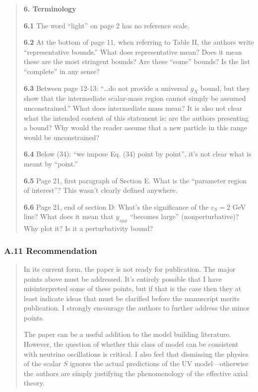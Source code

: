 \documentclass[
  chinese,
  UTF8]{ctexart}
\begin{document}
\begin{quote}
\textbf{6. Terminology}

\textbf{6.1} The word ``light'' on page 2 has no reference scale.

\textbf{6.2} At the bottom of page 11, when referring to Table II, the
authors write ``representative bounds.'' What does representative mean?
Does it mean these are the most stringent bounds? Are these ``some''
bounds? Is the list ``complete'' in any sense?

\textbf{6.3} Between page 12-13: ``\ldots do not provide a universal
\(g_X\) bound, but they show that the intermediate scalar-mass region
cannot simply be assumed unconstrained.'' What does intermediate mass
mean? It is also not clear what the intended content of this statement
is: are the authors presenting a bound? Why would the reader assume that
a new particle in this range would be unconstrained?

\textbf{6.4} Below (34): ``we impose Eq. (34) point by point'', it's not
clear what is meant by ``point.''

\textbf{6.5} Page 21, first paragraph of Section E. What is the
``parameter region of interest''? This wasn't clearly defined anywhere.

\textbf{6.6} Page 21, end of section D: What's the significance of the
\(v_S=2\) GeV line? What does it mean that \(y_{s\mu\mu}\) ``becomes
large'' (nonperturbative)? Why plot it? Is it a perturbativity bound?
\end{quote}

\subsubsection{A.11 Recommendation}\label{a.11-recommendation}

\begin{quote}
In its current form, the paper is not ready for publication. The major
points above must be addressed. It's entirely possible that I have
misinterpreted some of these points, but if that is the case then they
at least indicate ideas that must be clarified before the manuscript
merits publication. I strongly encourage the authors to further address
the minor points.

The paper can be a useful addition to the model building literature.
However, the question of whether this class of model can be consistent
with neutrino oscillations is critical. I also feel that dismissing the
physics of the scalar \(S\) ignores the actual predictions of the UV
model---otherwise the authors are simply justifying the phenomenology of
the effective axial theory.
\end{quote}
\end{document}
